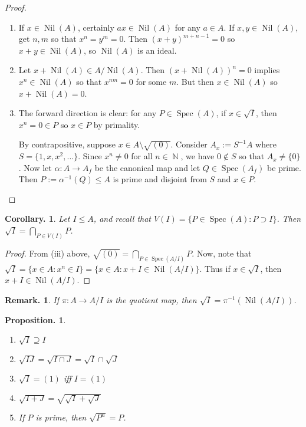 \documentclass[11pt, a4paper]{memoir}
\DeclareMathOperator{\N}{{\mathbb{N}}}
\theoremstyle{change}
\newtheorem{corollary}[theorem]{Corollary.}
\newtheorem{proposition}[theorem]{Proposition.}
\theoremstyle{plain}
\theoremstyle{nonumberplain}
\newtheorem{remark}{Remark.}
\newtheorem{proof}{Proof}
\DeclareMathOperator{\Nil}{Nil}
\DeclareMathOperator{\Spec}{Spec}
\numberwithin{equation}{section}
\begin{document}
\begin{proof}
    \begin{enumerate}[nl,r]
        \item If $x\in \Nil(A)$, certainly $ax\in\Nil(A)$ for any $a\in A$.
            If $x,y\in\Nil(A)$, get $n,m$ so that $x^n=y^m=0$.
            Then $(x+y)^{m+n-1}=0$ so $x+y\in\Nil(A)$, so $\Nil(A)$ is an ideal.

        \item Let $x+\Nil(A)\in A/\Nil(A)$.
            Then $\left(x+\Nil(A)\right)^n=0$ implies $x^n\in\Nil(A)$ so that $x^{nm}=0$ for some $m$.
            But then $x\in\Nil(A)$ so $x+\Nil(A)=0$.
        \item The forward direction is clear: for any $P\in\Spec(A)$, if $x\in\sqrt{I}$, then $x^n=0\in P$ so $x\in P$ by primality.

            By contrapositive, suppose $x\in A\setminus\sqrt{(0)}$.
            Consider $A_x:= S^{-1}A$ where $S=\{1,x,x^2,\ldots\}$.
            Since $x^n\neq 0$ for all $n\in\N$, we have $0\notin S$ so that $A_x\neq\{0\}$. %
            Now let $\alpha:A\to A_f$ be the canonical map and let $Q\in\Spec(A_f)$ be prime.
            Then $P:=\alpha^{-1}(Q)\leq A$ is prime and disjoint from $S$ and $x\in P$.
    \end{enumerate}
\end{proof}
\begin{corollary}
    Let $I\leq A$, and recall that $V(I)=\{P\in\Spec(A):P\supset I\}$.
    Then $\sqrt{I}=\bigcap_{P\in V(I)}P$.
\end{corollary}
\begin{proof}
    From (iii) above, $\sqrt{(0)}=\bigcap_{P\in\Spec(A/I)}P$.
    Now, note that $\sqrt{I}=\{x\in A:x^n\in I\}=\{x\in A:x+I\in\Nil(A/I)\}$.
    Thus if $x\in \sqrt{I}$, then $x+I\in\Nil(A/I)$.
\end{proof}
\begin{remark}
    If $\pi:A\to A/I$ is the quotient map, then $\sqrt{I}=\pi^{-1}(\Nil(A/I))$.
\end{remark}
\begin{proposition}
    \begin{enumerate}[nl,r]
        \item $\sqrt{I}\supseteq I$
        \item $\sqrt{IJ}=\sqrt{I\cap J}=\sqrt{I}\cap\sqrt{J}$
        \item $\sqrt{I}=(1)$ iff $I=(1)$
        \item $\sqrt{I+J}=\sqrt{\sqrt{I}+\sqrt{J}}$
        \item If $P$ is prime, then $\sqrt{P^n}=P$.
    \end{enumerate}
\end{proposition}
\end{document}
